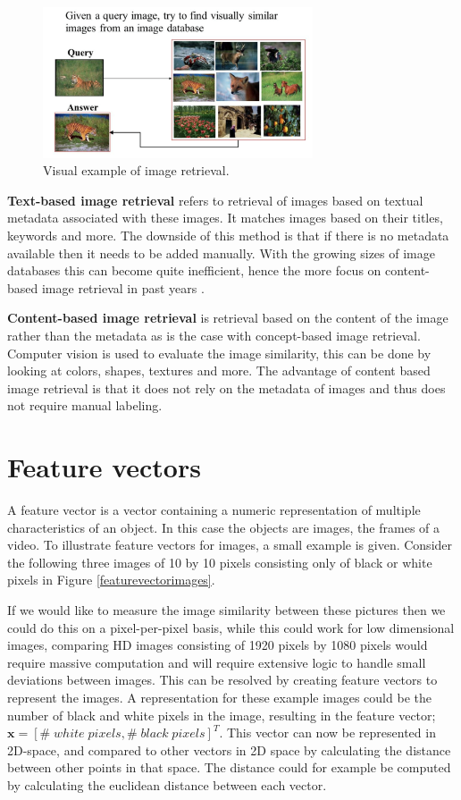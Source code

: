 \documentclass{report}
\begin{document}
\begin{figure}[H]
	\includegraphics[width=8cm]{images/imageretrieval.png}
	\centering
	\caption{Visual example of image retrieval.}
	\label{fig:imageretrieval}
\end{figure}

\textbf{Text-based image retrieval} refers to retrieval of images based on textual metadata associated with these images. It matches images based on their titles, keywords and more. The downside of this method is that if there is no metadata available then it needs to be added manually. With the growing sizes of image databases this can become quite inefficient, hence the more focus on content-based image retrieval in past years \cite{rajam2013survey}.

\textbf{Content-based image retrieval} is retrieval based on the content of the image rather than the metadata as is the case with concept-based image retrieval. Computer vision is used to evaluate the image similarity, this can be done by looking at colors, shapes, textures and more. The advantage of content based image retrieval is that it does not rely on the metadata of images and thus does not require manual labeling.

\section{Feature vectors}
A feature vector is a vector containing a numeric representation of multiple characteristics of an object. In this case the objects are images, the frames of a video. To illustrate feature vectors for images, a small example is given. Consider the following three images of 10 by 10 pixels consisting only of black or white pixels in Figure \ref{featurevectorimages}.

If we would like to measure the image similarity between these pictures then we could do this on a pixel-per-pixel basis, while this could work for low dimensional images, comparing HD images consisting of 1920 pixels by 1080 pixels would require massive computation and will require extensive logic to handle small deviations between images. This can be resolved by creating feature vectors to represent the images. A representation for these example images could be the number of black and white pixels in the image, resulting in the feature vector; $\textbf{x} = [\#\;white\;pixels, \#\;black\;pixels]^T$. This vector can now be represented in 2D-space, and compared to other vectors in 2D space by calculating the distance between other points in that space. The distance could for example be computed by calculating the euclidean distance between each vector.
\end{document}
